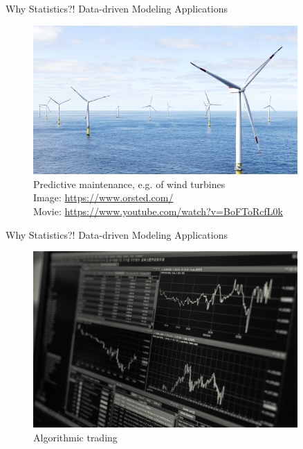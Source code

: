 \begin{frame}{Why Statistics?! Data-driven Modeling Applications}
    \begin{figure}
        \includegraphics[width=0.9\textwidth]{gfx/web/wind-turbines}
        Predictive maintenance, e.g. of wind turbines\\
        {\tiny Image: \href{https://www.orsted.com/}{https://www.orsted.com/}}\\
        {\tiny Movie: \url{https://www.youtube.com/watch?v=BoFToRcfL0k}}
    \end{figure}
\end{frame}

\begin{frame}{Why Statistics?! Data-driven Modeling Applications}
    \begin{figure}
        \includegraphics[width=0.9\textwidth]{gfx/web/black-and-white-business-chart}\\
        Algorithmic trading
    \end{figure}
\end{frame}

